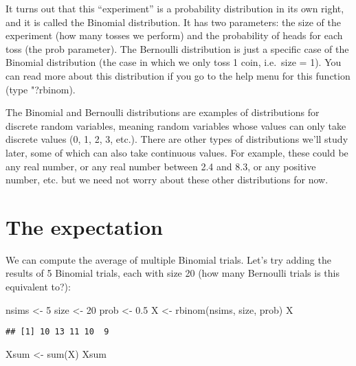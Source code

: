 \documentclass[
]{book}
\newenvironment{Shaded}{\begin{snugshade}}{\end{snugshade}}
\newcommand{\DecValTok}[1]{\textcolor[rgb]{0.00,0.00,0.81}{#1}}
\newcommand{\FloatTok}[1]{\textcolor[rgb]{0.00,0.00,0.81}{#1}}
\newcommand{\FunctionTok}[1]{\textcolor[rgb]{0.00,0.00,0.00}{#1}}
\newcommand{\NormalTok}[1]{#1}
\newcommand{\OtherTok}[1]{\textcolor[rgb]{0.56,0.35,0.01}{#1}}
\begin{document}
It turns out that this ``experiment'' is a probability distribution in its own right, and it is called the Binomial distribution. It has two parameters: the size of the experiment (how many tosses we perform) and the probability of heads for each toss (the prob parameter). The Bernoulli distribution is just a specific case of the Binomial distribution (the case in which we only toss 1 coin, i.e.~size = 1). You can read more about this distribution if you go to the help menu for this function (type "?rbinom).

The Binomial and Bernoulli distributions are examples of distributions for discrete random variables, meaning random variables whose values can only take discrete values (0, 1, 2, 3, etc.). There are other types of distributions we'll study later, some of which can also take continuous values. For example, these could be any real number, or any real number between 2.4 and 8.3, or any positive number, etc. but we need not worry about these other distributions for now.

\hypertarget{the-expectation}{%
\section{The expectation}\label{the-expectation}}

We can compute the average of multiple Binomial trials. Let's try adding the results of 5 Binomial trials, each with size 20 (how many Bernoulli trials is this equivalent to?):

\begin{Shaded}
\begin{Highlighting}[]
\NormalTok{nsims }\OtherTok{\textless{}{-}} \DecValTok{5}
\NormalTok{size }\OtherTok{\textless{}{-}} \DecValTok{20}
\NormalTok{prob }\OtherTok{\textless{}{-}} \FloatTok{0.5}
\NormalTok{X }\OtherTok{\textless{}{-}} \FunctionTok{rbinom}\NormalTok{(nsims, size, prob)}
\NormalTok{X}
\end{Highlighting}
\end{Shaded}

\begin{verbatim}
## [1] 10 13 11 10  9
\end{verbatim}

\begin{Shaded}
\begin{Highlighting}[]
\NormalTok{Xsum }\OtherTok{\textless{}{-}} \FunctionTok{sum}\NormalTok{(X)}
\NormalTok{Xsum}
\end{Highlighting}
\end{Shaded}
\end{document}
